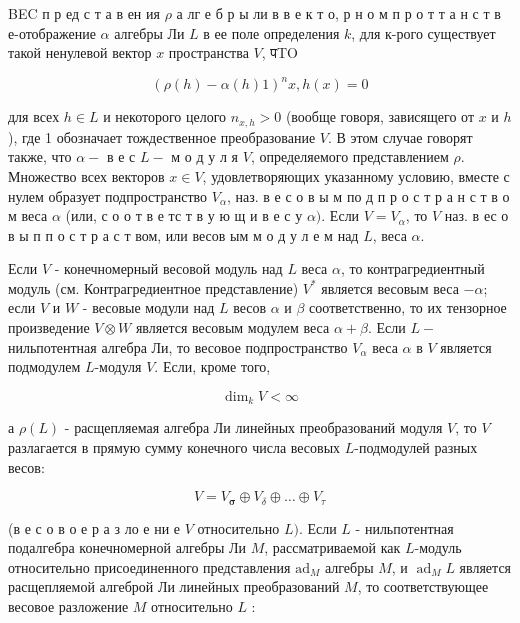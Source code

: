 \documentclass[10pt]{article}
\begin{document}
BEC п р ед с т а в ен ия $\rho$ а лг е б р ы ли в в е к т о, р н о м п р о т т а н с т в е-отображение $\alpha$ алгебры Ли $L$ в ее поле определения $k$, для к-рого существует такой ненулевой вектор $x$ пространства $V$, पTO



\[

(\rho(h)-\alpha(h) 1)^{n} x, h(x)=0

\]



для всех $h \in L$ и некоторого целого $n_{x, h}>0$ (вообще говоря, зависящего от $x$ и $h$ ), где 1 обозначает тождественное преобразование $V$. В этом случае говорят также, что $\alpha-$ в е с $L-$ м о д у л я $V$, определяемого представлением $\rho$. Множество всех векторов $x \in V$, удовлетворяющих указанному условию, вместе с нулем образует подпространство $V_{\alpha}$, наз. в е с о в ы м по д п р о с т р а н с т в о м веса $\alpha$ (или, с о о т в е тс т в у ю щ и в е с у $\alpha)$. Если $V=V_{\alpha}$, то $V$ наз. в ес о в ы п п о с т р а с т вом, или весов ым м о д у л е м над $L$, веса $\alpha$.



Если $V$ - конечномерный весовой модуль над $L$ веса $\alpha$, то контрагредиентный модуль (см. Контрагредиентное представление) $V^{*}$ является весовым веса $-\alpha$; если $V$ и $W$ - весовые модули над $L$ весов $\alpha$ и $\beta$ соответственно, то их тензорное произведение $V \otimes W$ является весовым модулем веса $\alpha+\beta$. Если $L-$ нильпотентная алгебра Ли, то весовое подпространство $V_{\alpha}$ веса $\alpha$ в $V$ является подмодулем $L$-модуля $V$. Если, кроме того,



\[

\operatorname{dim}_{k} V<\infty

\]



а $\rho(L)$ - расщепляемая алгебра Ли линейных преобразований модуля $V$, то $V$ разлагается в прямую сумму конечного числа весовых $L$-подмодулей разных весов:



\[

V=V_{\boldsymbol{\sigma}} \oplus V_{\delta} \oplus \ldots \oplus V_{\tau}

\]



(в е с о в о е р а з ло е ни е $V$ относительно $L)$. Если $L$ - нильпотентная подалгебра конечномерной алгебры Ли $M$, рассматриваемой как $L$-модуль относительно присоединенного представления $\mathrm{ad}_{M}$ алгебры $M$, и $\operatorname{ad}_{M} L$ является расщепляемой алгеброй Ли линейных преобразований $M$, то соответствующее весовое разложение $M$ относительно $L$ :
\end{document}
